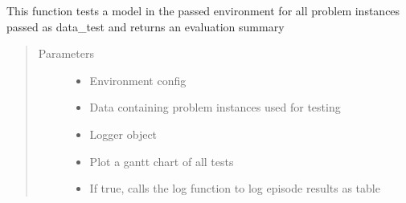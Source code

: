 \documentclass[letterpaper,10pt,english]{sphinxmanual}
\begin{document}
\begin{fulllineitems}
\label{\detokenize{agents.reinforcement_learning:agents.test.test_model}}
\sphinxAtStartPar
This function tests a model in the passed environment for all problem instances passed as data\_test and returns an
evaluation summary
\begin{quote}\begin{description}
\item[{Parameters}] \leavevmode\begin{itemize}
\item {} 
\sphinxAtStartPar
{} \textendash{} Environment config

\item {} 
\sphinxAtStartPar
{} \textendash{} Data containing problem instances used for testing

\item {} 
\sphinxAtStartPar
{} \textendash{} Logger object

\item {} 
\sphinxAtStartPar
{} \textendash{} Plot a gantt chart of all tests

\item {} 
\sphinxAtStartPar
{} \textendash{} If true, calls the log function to log episode results as table


\end{itemize}
\end{description}
\end{quote}
\end{fulllineitems}
\end{document}
